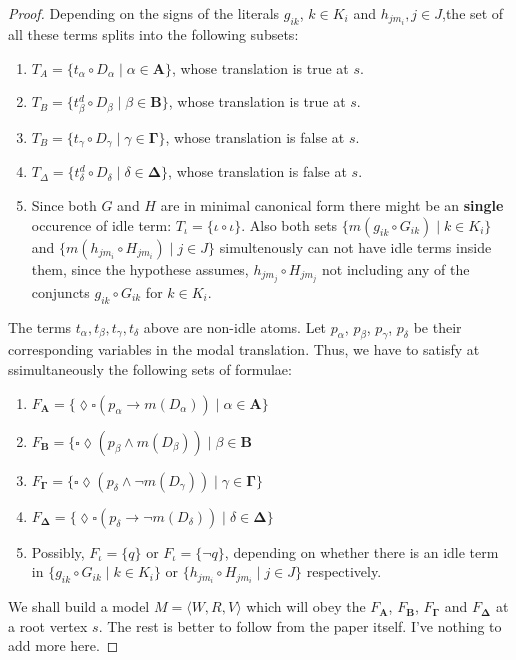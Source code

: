 \documentclass[10pt]{article}
\newcommand{\move}{\lozenge}
\newcommand{\Move}{\square}
\newcommand{\id}{\iota}
\begin{document}
\begin{proof}
			Depending on the signs of the literals $g_{ik}$, $k\in K_i$ and $h_{jm_i} ,j \in J$,the set of all these terms splits into the following subsets:
			
			\begin{enumerate}
				\item $T_A = \{t_\alpha \circ D_\alpha \mid \alpha \in \textbf{A}\}$, whose translation is true at $s$.
				\item $T_B = \{t^d_\beta \circ D_\beta  \mid \beta \in \textbf{B}\}$, whose translation is true at $s$.
				\item $T_B = \{t_\gamma \circ D_\gamma  \mid \gamma \in \mathbf{\Gamma}\}$, whose translation is false at $s$.
				\item $T_\Delta = \{t^d_\delta \circ D_\delta  \mid \delta \in \mathbf{\Delta}\}$, whose translation is false at $s$.
				\item Since both $G$ and $H$ are in minimal canonical form there might be an \textbf{single} occurence of idle term: $T_\id = \{\id\circ\id\}$. Also both sets $\{m(g_{ik} \circ G_{ik})\mid k\in K_i\}$ and $\{m(h_{jm_i} \circ H_{jm_i})\mid j \in J\}$ simultenously can not have idle terms inside them, since the hypothese assumes, $h_{jm_j} \circ H_{jm_j}$ not including any of the conjuncts $g_{ik} \circ G_{ik}$ for $k\in K_i$.
			\end{enumerate}
			
			The terms $t_\alpha,t_\beta,t_\gamma,t_\delta$ above are non-idle atoms. Let $p_\alpha$, $p_\beta$, $p_\gamma$, $p_\delta$ be
			their corresponding variables in the modal translation. Thus, we have to satisfy at ssimultaneously the following sets of formulae:
			
			\begin{enumerate}
				\item $F_\mathbf{A} = \{\move\Move(p_\alpha \rightarrow m(D_\alpha)) \mid \alpha \in \textbf{A}\}$
				\item $F_\mathbf{B} = \{\Move\move(p_\beta \land m(D_\beta)) \mid \beta\in \textbf{B}$
				\item $F_\mathbf{\Gamma} = \{\Move\move(p_\delta \land \neg m(D_\gamma)) \mid \gamma \in \mathbf{\Gamma}\}$
				\item $F_\mathbf{\Delta} = \{\move\Move(p_\delta \rightarrow \neg m(D_\delta)) \mid \delta \in \mathbf{\Delta}\}$
				\item Possibly, $F_\id=\{q\}$ or $F_\id = \{\neg q\}$, depending on whether there is an idle term in $\{g_{ik} \circ G_{ik} \mid k\in K_i\}$ or $\{h_{jm_i} \circ H_{jm_i}\mid j \in J\}$ respectively.
				\end{enumerate}
			
			We shall build a model $M= \langle W,R,V\rangle$ which will obey the $F_\mathbf{A}$, $F_\mathbf{B}$, $F_\mathbf{\Gamma}$ and $F_\mathbf{\Delta}$ at a root vertex $s$. The rest is better to follow from the paper itself. I've nothing to add more here.
		\end{proof}
		
\end{document}
